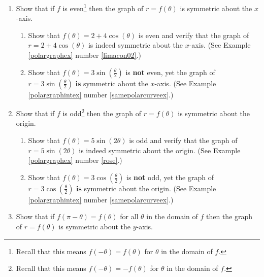 \begin{enumerate}

\setcounter{enumi}{\value{HW}}

\item Show that if $f$ is even\footnote{Recall that this means $f(-\theta) = f(\theta)$ for $\theta$ in the domain of $f$.} then the graph of $r = f(\theta)$ is symmetric about the $x$-axis. \label{sympolarfirst}

\begin{enumerate}

\item Show that $f(\theta) = 2 + 4\cos(\theta)$ is even and verify that the graph of  $r = 2+4\cos(\theta)$ is indeed symmetric about the $x$-axis.  (See Example \ref{polargraphex} number \ref{limacon02}.)

\item Show that $f(\theta) = 3\sin\left(\frac{\theta}{2}\right)$ is \textbf{not} even, yet the graph of $r = 3\sin\left(\frac{\theta}{2}\right)$ \textbf{is} symmetric about the $x$-axis.  (See  Example \ref{polargraphintex} number \ref{samepolarcurveex}.) 

\end{enumerate}

\item  Show that if $f$ is odd\footnote{Recall that this means $f(-\theta) = -f(\theta)$ for $\theta$ in the domain of $f$.} then the graph of $r = f(\theta)$ is symmetric about the origin.

\begin{enumerate}

\item  Show that $f(\theta) = 5\sin(2\theta)$ is odd and verify that the graph of $r = 5\sin(2\theta)$ is indeed symmetric about the origin.  (See Example \ref{polargraphex} number \ref{rose}.)

\item  Show that $f(\theta) = 3\cos\left(\frac{\theta}{2}\right)$ is \textbf{not} odd, yet the graph of $r = 3\cos\left(\frac{\theta}{2}\right)$ \textbf{is} symmetric about the origin.  (See  Example \ref{polargraphintex} number \ref{samepolarcurveex}.)

\end{enumerate}

\item  Show that if $ f(\pi-\theta)=f(\theta)$ for all $\theta$ in the domain of $f$ then the graph of $r = f(\theta)$ is symmetric about the $y$-axis. \label{sympolarlast}


\end{enumerate}
